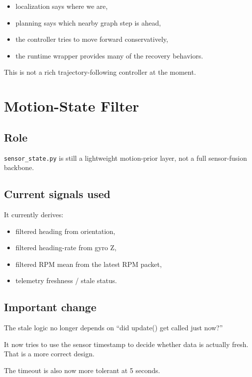 \documentclass[11pt,a4paper]{article}
\begin{document}
\begin{itemize}[nosep]
  \item localization says where we are,
  \item planning says which nearby graph step is ahead,
  \item the controller tries to move forward conservatively,
  \item the runtime wrapper provides many of the recovery behaviors.
\end{itemize}

This is not a rich trajectory-following controller at the moment.


\section{Motion-State Filter}

\subsection{Role}

\texttt{sensor\_state.py} is still a lightweight motion-prior layer, not a full
sensor-fusion backbone.

\subsection{Current signals used}

It currently derives:

\begin{itemize}[nosep]
  \item filtered heading from orientation,
  \item filtered heading-rate from gyro Z,
  \item filtered RPM mean from the latest RPM packet,
  \item telemetry freshness / stale status.
\end{itemize}

\subsection{Important change}

The stale logic no longer depends on ``did update() get called just now?''

It now tries to use the sensor timestamp to decide whether data is actually
fresh. That is a more correct design.

The timeout is also now more tolerant at 5 seconds.
\end{document}
